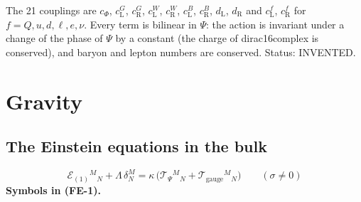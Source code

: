 \documentclass[
  10pt,
]{article}
\begin{document}
The 21 couplings are \(c_\Phi\), \(c^{G}_{\mathrm{L}}\),
\(c^{G}_{\mathrm{R}}\), \(c^{W}_{\mathrm{L}}\), \(c^{W}_{\mathrm{R}}\),
\(c^{B}_{\mathrm{L}}\), \(c^{B}_{\mathrm{R}}\), \(d_{\mathrm{L}}\),
\(d_{\mathrm{R}}\) and \(c^{f}_{\mathrm{L}}\), \(c^{f}_{\mathrm{R}}\)
for \(f = Q, u, d, \ell, e, \nu\). Every term is bilinear in \(\Psi\):
the action is invariant under a change of the phase of \(\Psi\) by a
constant (the charge of dirac16complex is conserved), and baryon and
lepton numbers are conserved. Status: INVENTED.

\hypertarget{gravity-1}{%
\section{Gravity}\label{gravity-1}}

\hypertarget{the-einstein-equations-in-the-bulk}{%
\subsection{The Einstein equations in the
bulk}\label{the-einstein-equations-in-the-bulk}}

\[
\mathcal{E}_{(1)}{}^M{}_N + \Lambda\,\delta^M_N = \kappa\,\big(\mathcal{T}_\Psi{}^M{}_N + \mathcal{T}_{\mathrm{gauge}}{}^M{}_N\big)
 \qquad (\sigma \ne 0) \tag{FE-1}
\] \textbf{Symbols in (FE-1).}
\end{document}
